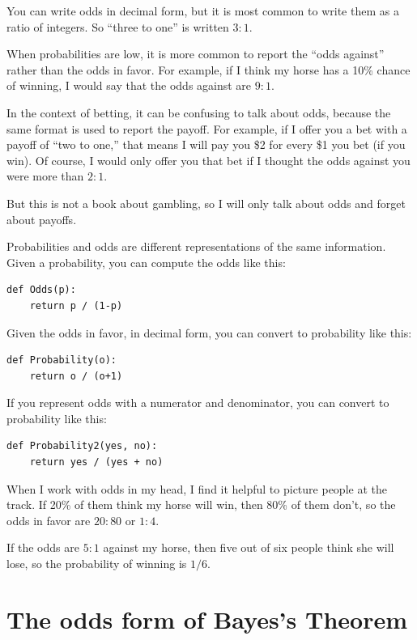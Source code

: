 \documentclass[12pt]{book}
\begin{document}
You can write odds in decimal form, but it is most common to
write them as a ratio of integers.  So ``three to one'' is
written $3:1$.

When probabilities are low, it is more common to report the
``odds against'' rather than the odds in favor.  For
example, if I think my horse has a 10\% chance of winning,
I would say that the odds against are $9:1$.

In the context of betting, it can be confusing to talk about
odds, because the same format is used to report the payoff.
For example, if I offer you a bet with a payoff of ``two to one,''
that means I will pay you \$2 for every \$1 you bet (if
you win).  Of course, I would only offer you that bet if
I thought the odds against you were more than $2:1$.

But this is not a book about gambling, so I will only talk about odds
and forget about payoffs.

Probabilities and odds are different representations of the
same information.  Given a probability, you can compute the
odds like this:

\begin{verbatim}
def Odds(p):
    return p / (1-p)
\end{verbatim}

Given the odds in favor, in decimal form, you can convert to
probability like this:

\begin{verbatim}
def Probability(o):
    return o / (o+1)
\end{verbatim}

If you represent odds with a numerator and denominator, you
can convert to probability like this:

\begin{verbatim}
def Probability2(yes, no):
    return yes / (yes + no)
\end{verbatim}

When I work with odds in my head, I find it helpful to picture
people at the track.  If 20\% of them think my horse will win,
then 80\% of them don't, so the odds in favor are $20:80$ or
$1:4$.

If the odds are $5:1$ against my horse, then five out of six
people think she will lose, so the probability of winning
is $1/6$.

\section{The odds form of Bayes's Theorem}
\end{document}
